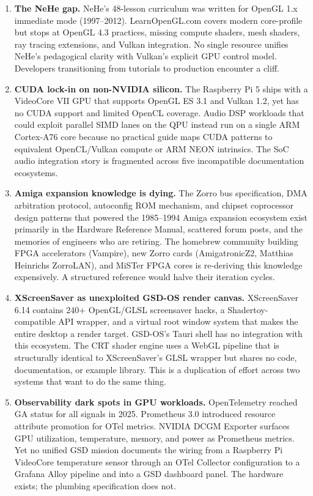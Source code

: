 \documentclass[11pt,letterpaper]{article}
\begin{document}
\begin{enumerate}
  \item \textbf{The NeHe gap.} NeHe's 48-lesson curriculum was written for OpenGL 1.x immediate mode (1997--2012). LearnOpenGL.com covers modern core-profile but stops at OpenGL 4.3 practices, missing compute shaders, mesh shaders, ray tracing extensions, and Vulkan integration. No single resource unifies NeHe's pedagogical clarity with Vulkan's explicit GPU control model. Developers transitioning from tutorials to production encounter a cliff.

  \item \textbf{CUDA lock-in on non-NVIDIA silicon.} The Raspberry Pi 5 ships with a VideoCore VII GPU that supports OpenGL ES 3.1 and Vulkan 1.2, yet has no CUDA support and limited OpenCL coverage. Audio DSP workloads that could exploit parallel SIMD lanes on the QPU instead run on a single ARM Cortex-A76 core because no practical guide maps CUDA patterns to equivalent OpenCL/Vulkan compute or ARM NEON intrinsics. The SoC audio integration story is fragmented across five incompatible documentation ecosystems.

  \item \textbf{Amiga expansion knowledge is dying.} The Zorro bus specification, DMA arbitration protocol, autoconfig ROM mechanism, and chipset coprocessor design patterns that powered the 1985--1994 Amiga expansion ecosystem exist primarily in the Hardware Reference Manual, scattered forum posts, and the memories of engineers who are retiring. The homebrew community building FPGA accelerators (Vampire), new Zorro cards (AmigatronicZ2, Matthias Heinrichs ZorroLAN), and MiSTer FPGA cores is re-deriving this knowledge expensively. A structured reference would halve their iteration cycles.

  \item \textbf{XScreenSaver as unexploited GSD-OS render canvas.} XScreenSaver 6.14 contains 240+ OpenGL/GLSL screensaver hacks, a Shadertoy-compatible API wrapper, and a virtual root window system that makes the entire desktop a render target. GSD-OS's Tauri shell has no integration with this ecosystem. The CRT shader engine uses a WebGL pipeline that is structurally identical to XScreenSaver's GLSL wrapper but shares no code, documentation, or example library. This is a duplication of effort across two systems that want to do the same thing.

  \item \textbf{Observability dark spots in GPU workloads.} OpenTelemetry reached GA status for all signals in 2025. Prometheus 3.0 introduced resource attribute promotion for OTel metrics. NVIDIA DCGM Exporter surfaces GPU utilization, temperature, memory, and power as Prometheus metrics. Yet no unified GSD mission documents the wiring from a Raspberry Pi VideoCore temperature sensor through an OTel Collector configuration to a Grafana Alloy pipeline and into a GSD dashboard panel. The hardware exists; the plumbing specification does not.
\end{enumerate}
\end{document}
